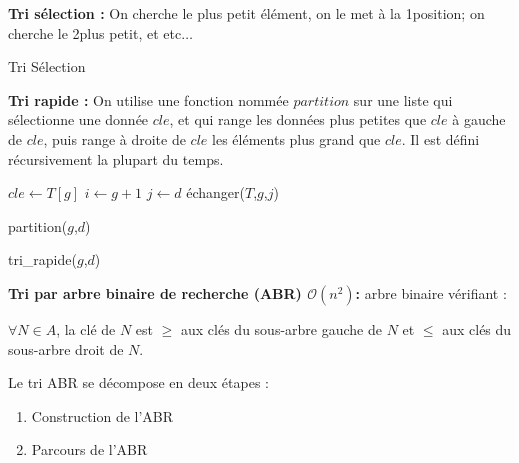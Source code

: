 \documentclass[a4paper, 8pt]{article}
\begin{document}
\begin{multicols*}{3}
\textbf{Tri sélection :} On cherche le plus petit élément, on le met à la 1\iere position; on cherche le 2\ieme plus petit, et etc$\hdots$

\begin{algorithm}[H]
 \caption{Tri Sélection}
\end{algorithm}

\textbf{Tri rapide :} On utilise une fonction nommée $partition$ sur une liste qui sélectionne une donnée $cle$, et qui range les données plus petites que $cle$ à gauche de $cle$, puis range à droite de $cle$ les éléments plus grand que $cle$. Il est défini récursivement la plupart du temps.
\begin{algorithm}[H]
  $cle \longleftarrow T\left[g\right]$ \;
  $i \longleftarrow g+1$ \;
  $j \longleftarrow d$ \;
  	échanger($T$,$g$,$j$)\;
 \caption{partition($g$,$d$)}
\end{algorithm}
\begin{algorithm}[H]
 \caption{tri\_rapide($g$,$d$)}
\end{algorithm}
\medskip

\textbf{Tri par arbre binaire de recherche (ABR) $\mathcal{O}(n^2)$:} arbre binaire vérifiant :
\begin{changemargin}{0.5cm}{0.5cm} 
\begin{center}
$\forall N\in A$, la clé de $N$ est $\geqslant$ aux clés du sous-arbre gauche de $N$ et $\leqslant$ aux clés du sous-arbre droit de $N$.
\end{center}
\end{changemargin}

Le tri ABR se décompose en deux étapes :
\begin{enumerate}
\item Construction de l'ABR 
\item Parcours de l'ABR
\end{enumerate}


\end{multicols*}
\end{document}

